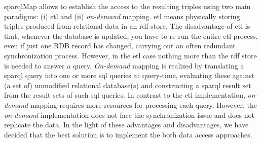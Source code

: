 \documentclass[PhD, Submit, ngerman,UKenglish,table]{scrbook}
\begin{document}
\gls{sparql}Map allows to establish the access to the resulting triples using two main paradigms: (i) \gls{etl} and (ii) \emph{on-demand} mapping.
\gls{etl} means physically storing triples produced from relational data in an \gls{rdf} store.
The disadvantage of \gls{etl} is that, whenever the database is updated, you have to re-run the entire \gls{etl} process, even if just one RDB record has changed, carrying out an often redundant synchronization process.
However, in the \gls{etl} case nothing more than the \gls{rdf} store is needed to answer a query.
\emph{On-demand} mapping is realized by translating a \gls{sparql} query into one or more \gls{sql} queries at query-time, evaluating these against (a set of) unmodified relational database(s) and constructing a \gls{sparql} result set from the result sets of such \gls{sql} queries.
In contrast to the \gls{etl} implementation, \emph{on-demand} mapping requires more resources for processing each query.
However, the \emph{on-demand} implementation does not face the synchronization issue and does not replicate the data.
In the light of these advantages and disadvantages, we have decided that the best solution is to implement the both data access approaches.
\end{document}
